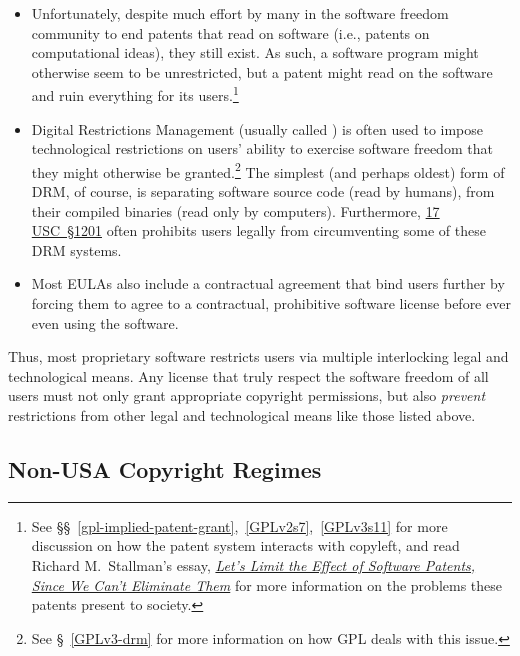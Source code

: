 \begin{itemize}

\item Unfortunately, despite much effort by many in the software freedom
  community to end patents that read on software (i.e., patents on
  computational ideas), they still exist.  As such, a software
  program might otherwise seem to be unrestricted, but a patent might read on
  the software and ruin everything for its users.\footnote{See
  \S\S~\ref{gpl-implied-patent-grant},~\ref{GPLv2s7},~\ref{GPLv3s11} for more
  discussion on how the patent system interacts with copyleft, and read
  Richard M.~Stallman's essay,
  \href{http://www.wired.com/opinion/2012/11/richard-stallman-software-patents/}{\textit{Let's
      Limit the Effect of Software Patents, Since We Can't Eliminate Them}}
  for more information on the problems these patents present to society.}

\item Digital Restrictions Management (usually called ) is often
  used to impose technological restrictions on users' ability to exercise
  software freedom that they might otherwise be granted.\footnote{See
    \S~\ref{GPLv3-drm} for more information on how GPL deals with this issue.}
  The simplest (and perhaps oldest) form of DRM, of course, is separating
  software source code (read by humans), from their compiled binaries (read
  only by computers).  Furthermore,
  \href{http://www.law.cornell.edu/uscode/text/17/1201}{17 USC~\S1201} often
  prohibits users legally from circumventing some of these DRM systems.

\item Most EULAs also include a contractual agreement that bind users further
  by forcing them to agree to a contractual, prohibitive software license
  before ever even using the software.

\end{itemize}

Thus, most proprietary software restricts users via multiple interlocking
legal and technological means.  Any license that truly respect the software
freedom of all users must not only grant appropriate copyright permissions,
but also \textit{prevent} restrictions from other legal and technological
means like those listed above.

\subsection{Non-USA Copyright Regimes}
\label{non-usa-copyright}

